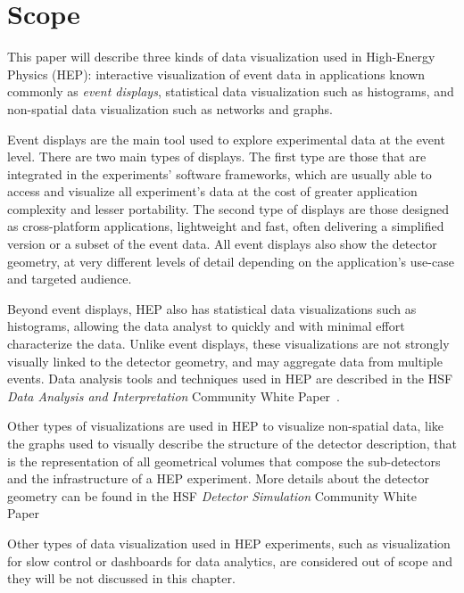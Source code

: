 \documentclass[12pt,a4paper]{article}
\begin{document}
\newpage


\hypertarget{scope}{%
\section{Scope}\label{scope}}

This paper will describe three kinds of data visualization used in High-Energy Physics (HEP): interactive visualization
of event data in applications known commonly as \emph{event displays}, statistical data visualization such as
histograms, and non-spatial data visualization such as networks and graphs.

Event displays are the main tool used to explore experimental data at the event level.
There are two main types of displays. The first type are those that are integrated in the experiments’ software frameworks,
which are usually able to access and visualize all experiment’s data at the cost of greater application complexity and lesser portability.
The second type of displays are those designed as cross-platform applications, lightweight and fast, often
delivering a simplified version or a subset of the event data. All event displays also show the detector geometry, at very different levels of detail depending on the application's use-case and targeted audience.

Beyond event displays, HEP also has statistical data visualizations such as histograms, allowing the data analyst to quickly
and with minimal effort characterize the data.
Unlike event displays, these visualizations are not strongly visually linked to the detector geometry,
and may aggregate data from multiple events. Data analysis tools and techniques used in HEP are
described in the HSF \textit{Data Analysis and Interpretation} Community White Paper~\cite{HSF-CWP-2017-05}.

Other types of visualizations are used in HEP to
visualize non-spatial data, like the graphs used to visually describe the structure of the detector description, that is 
the representation of all geometrical volumes that compose the sub-detectors and the infrastructure of a HEP experiment.
More details about the detector geometry can be found in the HSF \textit{Detector Simulation} Community White Paper~\cite{HSF-CWP-2017-07}

Other types of data visualization used in HEP experiments, such as visualization for slow control
or dashboards for data analytics, are considered out of scope and they will be not discussed in this chapter.
\end{document}
